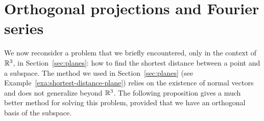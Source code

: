 \section{Orthogonal projections and Fourier series}

\begingroup


We now reconsider a problem that we briefly encountered, only in the
context of $\mathbb{R}^3$, in Section~\ref{sec:planes}: how to find the
shortest distance between a point and a subspace. The method we used
in Section~\ref{sec:planes} (see
Example~\ref{exa:shortest-distance-plane}) relies on the existence of
normal vectors and does not generalize beyond $\mathbb{R}^3$. The following
proposition gives a much better method for solving this problem,
provided that we have an orthogonal basis of the subspace.

